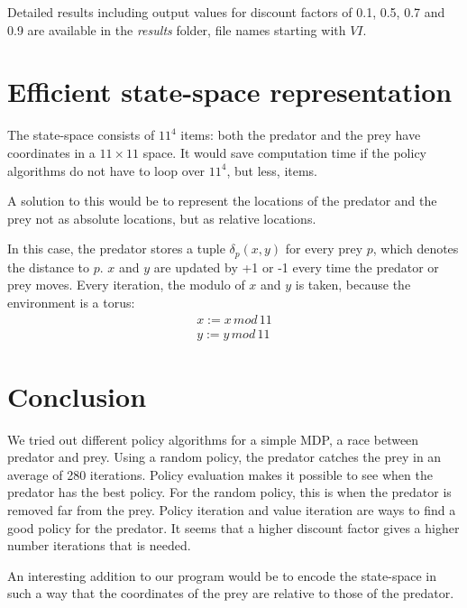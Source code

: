 \documentclass{article}
\begin{document}
Detailed results including output values for discount factors of 0.1, 0.5, 0.7 and 0.9 are available in the \emph{results} folder, file names starting with $VI$.
\section{Efficient state-space representation}
The state-space consists of $11^4$ items: both the predator and the prey have coordinates in a $11 \times 11$ space. It would save computation time if the policy algorithms do not have to loop over $11^4$, but less, items.

A solution to this would be to represent the locations of the predator and the prey not as absolute locations, but as relative locations.

In this case, the predator stores a tuple $\delta_{p}(x,y)$ for every prey $p$, which denotes the distance to $p$. $x$ and $y$ are updated by +1 or -1 every time the predator or prey moves. Every iteration, the modulo of $x$ and $y$ is taken, because the environment is a torus:
\begin{align}
x := x\,mod\,11\\
y := y\,mod\,11
\end{align}

\section{Conclusion}
We tried out different policy algorithms for a simple MDP, a race between predator and prey. Using a random policy, the predator catches the prey in an average of 280 iterations. Policy evaluation makes it possible to see when the predator has the best policy. For the random policy, this is when the predator is removed far from the prey. Policy iteration and value iteration are ways to find a good policy for the predator. It seems that a higher discount factor gives a higher number iterations that is needed.

An interesting addition to our program would be to encode the state-space in such a way that the coordinates of the prey are relative to those of the predator. 
\end{document}
